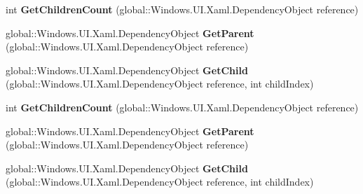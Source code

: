 \begin{DoxyCompactItemize}
\item 
\mbox{\label{interface_windows_1_1_u_i_1_1_xaml_1_1_media_1_1_i_visual_tree_helper_statics_a19a9de9748e05ab7dafe6fb4c77aa8c4}} 
int {\bfseries Get\+Children\+Count} (global\+::\+Windows.\+U\+I.\+Xaml.\+Dependency\+Object reference)
\item 
\mbox{\label{interface_windows_1_1_u_i_1_1_xaml_1_1_media_1_1_i_visual_tree_helper_statics_afa2a74a737472e8406e293600f259a5d}} 
global\+::\+Windows.\+U\+I.\+Xaml.\+Dependency\+Object {\bfseries Get\+Parent} (global\+::\+Windows.\+U\+I.\+Xaml.\+Dependency\+Object reference)
\item 
\mbox{\label{interface_windows_1_1_u_i_1_1_xaml_1_1_media_1_1_i_visual_tree_helper_statics_a00c15dcff89839a4bacfb9de1747f0ad}} 
global\+::\+Windows.\+U\+I.\+Xaml.\+Dependency\+Object {\bfseries Get\+Child} (global\+::\+Windows.\+U\+I.\+Xaml.\+Dependency\+Object reference, int child\+Index)
\item 
\mbox{\label{interface_windows_1_1_u_i_1_1_xaml_1_1_media_1_1_i_visual_tree_helper_statics_a19a9de9748e05ab7dafe6fb4c77aa8c4}} 
int {\bfseries Get\+Children\+Count} (global\+::\+Windows.\+U\+I.\+Xaml.\+Dependency\+Object reference)
\item 
\mbox{\label{interface_windows_1_1_u_i_1_1_xaml_1_1_media_1_1_i_visual_tree_helper_statics_afa2a74a737472e8406e293600f259a5d}} 
global\+::\+Windows.\+U\+I.\+Xaml.\+Dependency\+Object {\bfseries Get\+Parent} (global\+::\+Windows.\+U\+I.\+Xaml.\+Dependency\+Object reference)
\item 
\mbox{\label{interface_windows_1_1_u_i_1_1_xaml_1_1_media_1_1_i_visual_tree_helper_statics_a00c15dcff89839a4bacfb9de1747f0ad}} 
global\+::\+Windows.\+U\+I.\+Xaml.\+Dependency\+Object {\bfseries Get\+Child} (global\+::\+Windows.\+U\+I.\+Xaml.\+Dependency\+Object reference, int child\+Index)

\end{DoxyCompactItemize}
